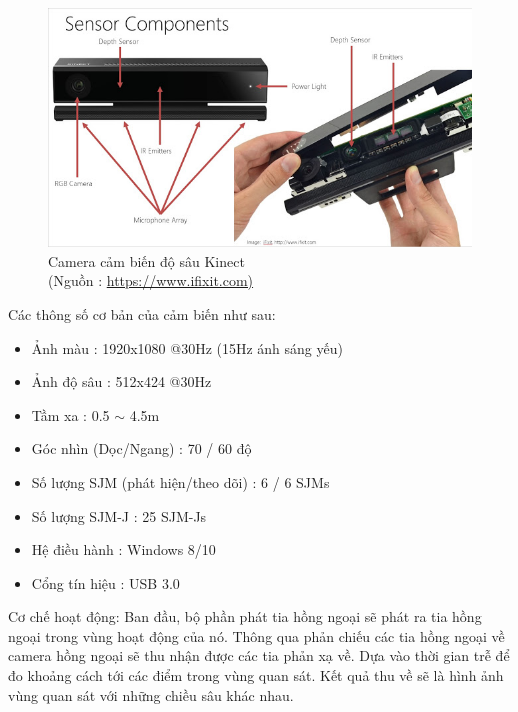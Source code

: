 \FloatBarrier
\begin{figure}[htp]
\begin{center}
\includegraphics[scale=0.8]{chap3/c3_figs/kinect.png}
\end{center}
\caption{Camera cảm biến độ sâu Kinect \\(Nguồn : \url{https://www.ifixit.com)}}
\label{fig:kinect}
\end{figure}
\FloatBarrier

Các thông số cơ bản của cảm biến như sau:
\begin{itemize}
\item Ảnh màu : 1920x1080 @30Hz (15Hz ánh sáng yếu)
\item Ảnh độ sâu : 512x424 @30Hz
\item Tầm xa : 0.5 $\sim$ 4.5m
\item Góc nhìn (Dọc/Ngang) : 70 / 60 độ
\item Số lượng SJM (phát hiện/theo dõi) : 6 / 6 SJMs
\item Số lượng SJM-J : 25 SJM-Js
\item Hệ điều hành : Windows 8/10
\item Cổng tín hiệu : USB 3.0
\end{itemize}

Cơ chế hoạt động: Ban đầu, bộ phần phát tia hồng ngoại sẽ phát ra tia hồng ngoại trong vùng hoạt động của nó. Thông qua phản chiếu các tia hồng ngoại về camera hồng ngoại sẽ thu nhận được các tia phản xạ về. Dựa vào thời gian trễ để đo khoảng cách tới các điểm trong vùng quan sát. Kết quả thu về sẽ là hình ảnh vùng quan sát với những chiều sâu khác nhau.

